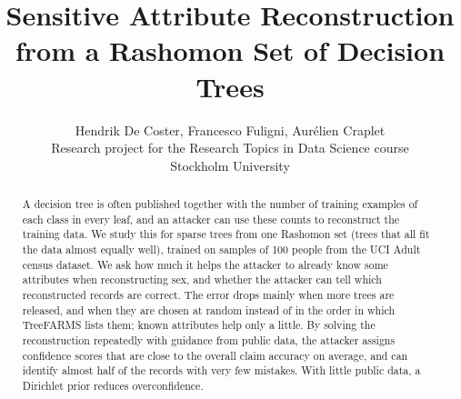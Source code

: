 

\usepackage[T1]{fontenc}
\usepackage[utf8]{inputenc}
\usepackage{graphicx}
\graphicspath{{../figures/}}
\usepackage{booktabs}
\usepackage{amsmath}
\usepackage{amssymb}
\usepackage{url}
\usepackage{enumitem}
\setcounter{topnumber}{3}
\renewcommand{\topfraction}{0.8}

\title{Sensitive Attribute Reconstruction\\from a Rashomon Set of Decision Trees}
\author{Hendrik De Coster, Francesco Fuligni, Aur\'elien Craplet \\
  Research project for the Research Topics in Data Science course \\
  Stockholm University}
\date{}


\maketitle

\begin{abstract}
A decision tree is often published together with the number of training examples of each
class in every leaf, and an attacker can use these counts to reconstruct the training data.
We study this for sparse trees from one Rashomon set (trees that all fit the data almost
equally well), trained on samples of 100 people from the UCI Adult census dataset. We ask how much it helps the attacker to already
know some attributes when reconstructing sex, and whether the attacker can tell which
reconstructed records are correct. The error drops mainly when more trees are released, and
when they are chosen at random instead of in the order in which TreeFARMS lists them; known
attributes help only a little. By solving the reconstruction repeatedly with guidance from
public data, the attacker assigns confidence scores that are close to the overall claim accuracy on
average, and can identify almost half of the records with very few mistakes. With little
public data, a Dirichlet prior reduces overconfidence.
\end{abstract}











